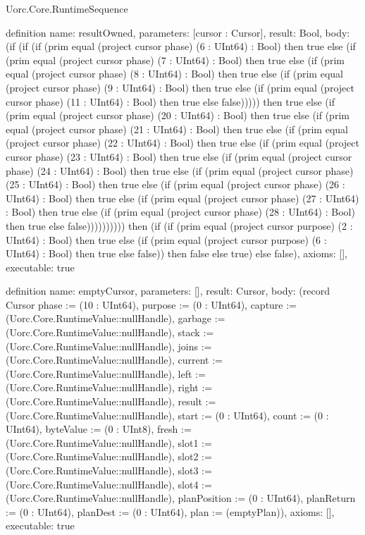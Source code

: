 \begin{lexlean}{Uorc.Core.RuntimeSequence}
\begin{semanticmodule}
definition{
  name: resultOwned,
  parameters: [cursor : Cursor],
  result: Bool,
  body: (if (if (if (prim equal (project cursor phase) (6 : UInt64) : Bool) then true else (if (prim equal (project cursor phase) (7 : UInt64) : Bool) then true else (if (prim equal (project cursor phase) (8 : UInt64) : Bool) then true else (if (prim equal (project cursor phase) (9 : UInt64) : Bool) then true else (if (prim equal (project cursor phase) (11 : UInt64) : Bool) then true else false))))) then true else (if (prim equal (project cursor phase) (20 : UInt64) : Bool) then true else (if (prim equal (project cursor phase) (21 : UInt64) : Bool) then true else (if (prim equal (project cursor phase) (22 : UInt64) : Bool) then true else (if (prim equal (project cursor phase) (23 : UInt64) : Bool) then true else (if (prim equal (project cursor phase) (24 : UInt64) : Bool) then true else (if (prim equal (project cursor phase) (25 : UInt64) : Bool) then true else (if (prim equal (project cursor phase) (26 : UInt64) : Bool) then true else (if (prim equal (project cursor phase) (27 : UInt64) : Bool) then true else (if (prim equal (project cursor phase) (28 : UInt64) : Bool) then true else false)))))))))) then (if (if (prim equal (project cursor purpose) (2 : UInt64) : Bool) then true else (if (prim equal (project cursor purpose) (6 : UInt64) : Bool) then true else false)) then false else true) else false),
  axioms: [],
  executable: true
}

definition{
  name: emptyCursor,
  parameters: [],
  result: Cursor,
  body: (record Cursor {phase := (10 : UInt64), purpose := (0 : UInt64), capture := (Uorc.Core.RuntimeValue::nullHandle), garbage := (Uorc.Core.RuntimeValue::nullHandle), stack := (Uorc.Core.RuntimeValue::nullHandle), joins := (Uorc.Core.RuntimeValue::nullHandle), current := (Uorc.Core.RuntimeValue::nullHandle), left := (Uorc.Core.RuntimeValue::nullHandle), right := (Uorc.Core.RuntimeValue::nullHandle), result := (Uorc.Core.RuntimeValue::nullHandle), start := (0 : UInt64), count := (0 : UInt64), byteValue := (0 : UInt8), fresh := (Uorc.Core.RuntimeValue::nullHandle), slot1 := (Uorc.Core.RuntimeValue::nullHandle), slot2 := (Uorc.Core.RuntimeValue::nullHandle), slot3 := (Uorc.Core.RuntimeValue::nullHandle), slot4 := (Uorc.Core.RuntimeValue::nullHandle), planPosition := (0 : UInt64), planReturn := (0 : UInt64), planDest := (0 : UInt64), plan := (emptyPlan)}),
  axioms: [],
  executable: true
}


\end{semanticmodule}
\end{lexlean}
